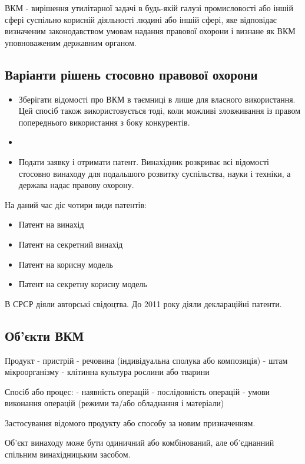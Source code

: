 ВКМ - вирішення утилітарної задачі в будь-якій галузі промисловості або іншій сфері суспільно корисній діяльності людині або іншій сфері, яке відповідає визначеним законодавством умовам надання правової охорони і визнане як ВКМ уповноваженим державним органом.

\subsection{Варіанти рішень стосовно правової охорони}
\begin{itemize}
	\item Зберігати відомості про ВКМ в таємниці в лише для власного використання. Цей спосіб також використовується тоді, коли можливі зловживання із правом попереднього використання з боку конкурентів.
	\item
	\item Подати заявку і отримати патент. Винахідник розкриває всі відомості стосовно винаходу для подальшого розвитку суспільства, науки і техніки, а держава надає правову охорону. 
\end{itemize} 

На даний час діє чотири види патентів:
\begin{itemize}
	\item Патент на винахід 
	\item Патент на секретний винахід
	\item Патент на корисну модель
	\item Патент на секретну корисну модель
\end{itemize}

В СРСР діяли авторські свідоцтва. До 2011 року діяли деклараційні патенти.

\subsection{Об’єкти ВКМ}
Продукт
- пристрій 
- речовина (індивідуальна сполука або композиція)
- штам мікроорганізму
- клітинна культура рослини або тварини

Спосіб або процес:
- наявність операцій
- послідовність операцій
- умови виконання операцій (режими та/або обладнання і матеріали)

Застосування відомого продукту або способу за новим призначенням.

Об’єкт винаходу може бути одиничний або комбінований, але об’єднанний спільним винахідницьким засобом.

